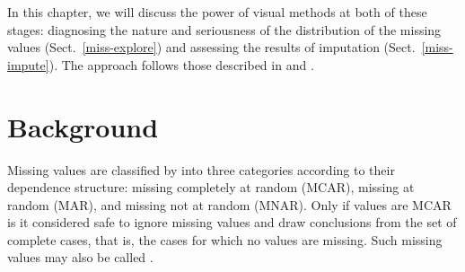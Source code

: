 In this chapter, we will discuss the power of visual methods at both
of these stages: diagnosing the nature and seriousness of the
distribution of the missing values (Sect.~\ref{miss-explore}) and
assessing the results of imputation (Sect.~\ref{miss-impute}).  The
approach follows those described in  and
.



\section{Background}




Missing values are classified by  into three
categories according to their dependence structure: missing completely
at random (MCAR), missing at random (MAR), and missing not at random
(MNAR).  Only if values are MCAR is it considered safe to ignore
missing values and draw conclusions from the set of
complete cases, that is, the cases for which no values are missing.
Such missing values may also be called .


